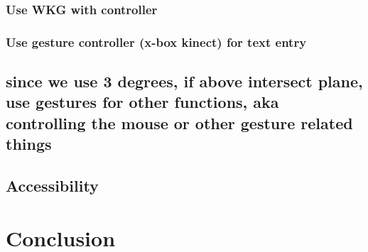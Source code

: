 \subsubsection{Use WKG with controller}

\subsubsection{Use gesture controller (x-box kinect) for text entry}

\subsection{since we use 3 degrees, if above intersect plane, use gestures for other functions, aka controlling the mouse or other gesture related things}

\subsection{Accessibility}

\section {Conclusion}
